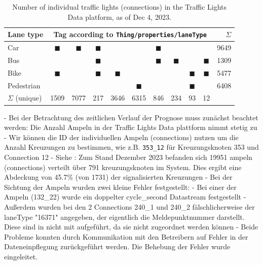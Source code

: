 \begin{table}[b]
    \centering
    \begin{tabular}{@{}l|ccccccccc|r@{}}
        \hline
        Lane type & \multicolumn{9}{c|}{Tag according to \texttt{Thing/properties/laneType}} & $\Sigma$ \\
        \hline
        Car        & $\blacksquare$ & $\blacksquare$ & $\blacksquare$ &   &   & $\blacksquare$ &   &   &   &  9649 \\
        Bus        &   &   & $\blacksquare$ &   &   & $\blacksquare$ & $\blacksquare$ &   & $\blacksquare$ &  1309 \\
        Bike     & $\blacksquare$ &   & $\blacksquare$ & $\blacksquare$ &   &   &   & $\blacksquare$ & $\blacksquare$ &  5477 \\
        Pedestrian &   &   &   &   & $\blacksquare$ &   &   & $\blacksquare$ &   &  6408 \\
        \hline
        $\Sigma$ (unique) & 1509 & 7077 & 217 & 3646 & 6315 & 846 & 234 & 93 & 12 & \\
        \hline
    \end{tabular}
    \caption{Number of individual traffic lights (connections) in the Traffic Lights Data platform, as of Dec 4, 2023.}
    \label{tab:tld-number-of-things}
\end{table}

- Bei der Betrachtung des zeitlichen Verlauf der Prognose muss zunächst beachtet werden: Die Anzahl Ampeln in der Traffic Lights Data plattform nimmt stetig zu
- Wir können die ID der individuellen Ampeln (connections) nutzen um die Anzahl Kreuzungen zu bestimmen, wie z.B. \texttt{353\_12} für Kreuzungsknoten 353 und Connection 12
- Siehe : Zum Stand Dezember 2023 befanden sich 19951 ampeln (connections) verteilt über 791 kreuzungsknoten im System. Dies ergibt eine Abdeckung von 45.7\% (von 1731) der signalisierten Kreuzungen
- Bei der Sichtung der Ampeln wurden zwei kleine Fehler festgestellt:
- Bei einer der Ampeln (132\_22) wurde ein doppelter cycle\_second Datastream festgestellt
- Außerdem wurden bei den 2 Connections 240\_1 und 240\_2 fälschlicherweise der laneType "16371" angegeben, der eigentlich die Meldepunktnummer darstellt. Diese sind in  nicht mit aufgeführt, da sie nicht zugeordnet werden können
- Beide Probleme konnten durch Kommunikation mit den Betreibern auf Fehler in der Dateneinpflegung zurückgeführt werden. Die Behebung der Fehler wurde eingeleitet.

